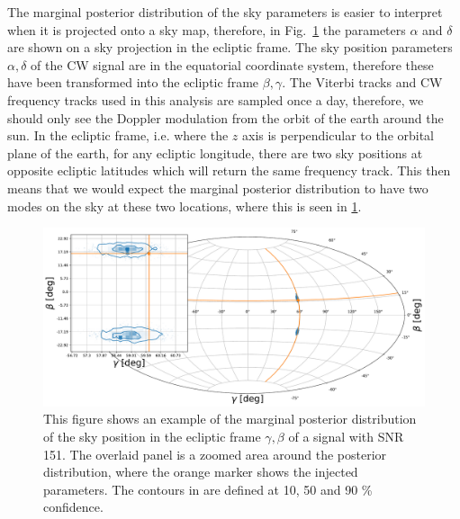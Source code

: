The marginal posterior distribution of the sky parameters is easier to
interpret when it is projected onto a sky map, therefore,
in Fig.~\ref{par_est:results:example_skypos} the parameters $\alpha$ and $\delta$
are shown on a sky projection in the ecliptic frame. The sky
position parameters $\alpha,\delta$ of the \gls{CW} signal are in the
equatorial coordinate system, therefore these have been transformed into the
ecliptic frame $\beta,\gamma$. The Viterbi tracks and \gls{CW} frequency tracks used in this
analysis are sampled once a day, therefore, we should only see the Doppler
modulation from the orbit of the earth around the sun.  In the ecliptic frame,
i.e. where the $z$ axis is perpendicular to the orbital plane of the earth, for
any ecliptic longitude, there are two sky positions at opposite ecliptic
latitudes which will return the same frequency track.  This then means that we
would expect the marginal posterior distribution to have two modes on the sky
at these two locations, where this is seen in
\ref{par_est:results:example_skypos}.
%
\begin{figure}[ht]
    \centering
    \includegraphics[width=\linewidth]{C5_parameter/skypos_ecliptic.pdf}
    \caption[Example of posterior of sky position in ecliptic frame]{This
figure shows an example of the marginal posterior distribution of the sky
position in the ecliptic frame
$\gamma, \beta$ of a signal with \gls{SNR} 151. The
overlaid panel is a zoomed area around the posterior distribution, where the
orange marker shows the injected parameters. The contours in are defined at 10, 50 and 90 \% confidence.} \label{par_est:results:example_skypos}   
\end{figure}
%

%
%
